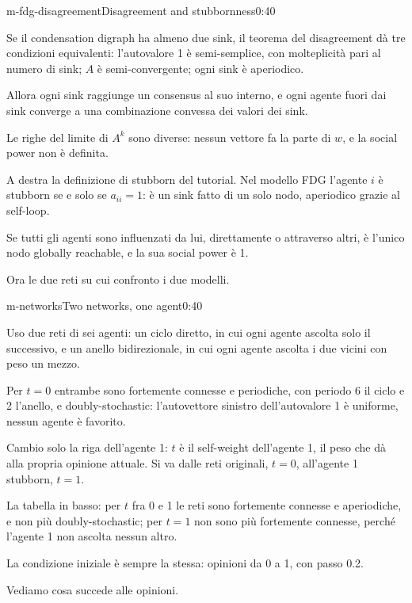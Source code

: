 \begin{slide}{m-fdg-disagreement}{Disagreement and stubbornness}{0:40}
  \begin{discorso}
    \item Se il condensation digraph ha almeno due sink, il teorema del disagreement dà tre condizioni equivalenti: l'autovalore 1 è semi-semplice, con molteplicità pari al numero di sink; $A$ è semi-convergente; ogni sink è aperiodico.
    \item Allora ogni sink raggiunge un consensus al suo interno, e ogni agente fuori dai sink converge a una combinazione convessa dei valori dei sink.
    \item Le righe del limite di $A^k$ sono diverse: nessun vettore fa la parte di $w$, e la social power non è definita.
    \item A destra la definizione di stubborn del tutorial. Nel modello FDG l'agente $i$ è stubborn se e solo se $a_{ii}=1$: è un sink fatto di un solo nodo, aperiodico grazie al self-loop.
    \item Se tutti gli agenti sono influenzati da lui, direttamente o attraverso altri, è l'unico nodo globally reachable, e la sua social power è 1.
    \item Ora le due reti su cui confronto i due modelli.
  \end{discorso}
\end{slide}

\begin{slide}{m-networks}{Two networks, one agent}{0:40}
  \begin{discorso}
    \item Uso due reti di sei agenti: un ciclo diretto, in cui ogni agente ascolta solo il successivo, e un anello bidirezionale, in cui ogni agente ascolta i due vicini con peso un mezzo.
    \item Per $t=0$ entrambe sono fortemente connesse e periodiche, con periodo 6 il ciclo e 2 l'anello, e doubly-stochastic: l'autovettore sinistro dell'autovalore 1 è uniforme, nessun agente è favorito.
    \item Cambio solo la riga dell'agente 1: $t$ è il self-weight dell'agente 1, il peso che dà alla propria opinione attuale. Si va dalle reti originali, $t=0$, all'agente 1 stubborn, $t=1$.
    \item La tabella in basso: per $t$ fra 0 e 1 le reti sono fortemente connesse e aperiodiche, e non più doubly-stochastic; per $t=1$ non sono più fortemente connesse, perché l'agente 1 non ascolta nessun altro.
    \item La condizione iniziale è sempre la stessa: opinioni da 0 a 1, con passo 0.2.
    \item Vediamo cosa succede alle opinioni.
  \end{discorso}
\end{slide}

